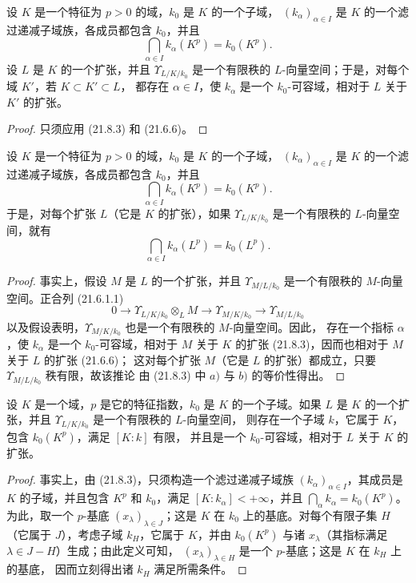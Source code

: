 
\begin{corollary}[21.8.4]
\label{0.21.8.4-fr}
设 $K$ 是一个特征为 $p>0$ 的域，$k_0$ 是 $K$ 的一个子域，
$(k_\alpha)_{\alpha\in I}$ 是 $K$ 的一个滤过递减子域族，各成员都包含
$k_0$，并且
\[
  \bigcap_{\alpha\in I}k_\alpha(K^p)=k_0(K^p).
\]
设 $L$ 是 $K$ 的一个扩张，并且 $\Upsilon_{L/K/k_0}$ 是一个有限秩的
$L$-向量空间；于是，对每个域 $K'$，若 $K\subset K'\subset L$，
都存在 $\alpha\in I$，使 $k_\alpha$ 是一个 $k_0$-可容域，相对于 $L$
关于 $K'$ 的扩张。
\end{corollary}

\begin{proof}
只须应用 (21.8.3) 和 (21.6.6)。
\end{proof}

\begin{corollary}[21.8.5]
\label{0.21.8.5-fr}
设 $K$ 是一个特征为 $p>0$ 的域，$k_0$ 是 $K$ 的一个子域，
$(k_\alpha)_{\alpha\in I}$ 是 $K$ 的一个滤过递减子域族，各成员都包含
$k_0$，并且
\[
  \bigcap_{\alpha\in I}k_\alpha(K^p)=k_0(K^p).
\]
于是，对每个扩张 $L$（它是 $K$ 的扩张），如果 $\Upsilon_{L/K/k_0}$ 是一个有限秩的
$L$-向量空间，就有
\[
  \bigcap_{\alpha\in I}k_\alpha(L^p)=k_0(L^p).
\]
\end{corollary}

\begin{proof}
事实上，假设 $M$ 是 $L$ 的一个扩张，并且 $\Upsilon_{M/L/k_0}$ 是一个有限秩的
$M$-向量空间。正合列 (21.6.1.1)
\[
  0\longrightarrow \Upsilon_{L/K/k_0}\otimes_L M
  \longrightarrow \Upsilon_{M/K/k_0}
  \longrightarrow \Upsilon_{M/L/k_0}
\]
以及假设表明，$\Upsilon_{M/K/k_0}$ 也是一个有限秩的 $M$-向量空间。因此，
存在一个指标 $\alpha$，使 $k_\alpha$ 是一个 $k_0$-可容域，相对于 $M$
关于 $K$ 的扩张 (21.8.3)，因而也相对于 $M$ 关于 $L$ 的扩张 (21.6.6)；
这对每个扩张 $M$（它是 $L$ 的扩张）都成立，只要 $\Upsilon_{M/L/k_0}$ 秩有限，故该推论
由 (21.8.3) 中 $a)$ 与 $b)$ 的等价性得出。
\end{proof}

\begin{corollary}[21.8.6]
\label{0.21.8.6-fr}
设 $K$ 是一个域，$p$ 是它的特征指数，$k_0$ 是 $K$ 的一个子域。如果 $L$
是 $K$ 的一个扩张，并且 $\Upsilon_{L/K/k_0}$ 是一个有限秩的 $L$-向量空间，
则存在一个子域 $k$，它属于 $K$，包含 $k_0(K^p)$，满足 $[K:k]$ 有限，
并且是一个 $k_0$-可容域，相对于 $L$ 关于 $K$ 的扩张。
\end{corollary}

\begin{proof}
事实上，由 (21.8.3)，只须构造一个滤过递减子域族
$(k_\alpha)_{\alpha\in I}$，其成员是 $K$ 的子域，并且包含 $K^p$ 和 $k_0$，满足
$[K:k_\alpha]<+\infty$，并且
$\bigcap_\alpha k_\alpha=k_0(K^p)$。为此，取一个 $p$-基底
$(x_\lambda)_{\lambda\in J}$；这是 $K$ 在 $k_0$ 上的基底。对每个有限子集
$H$（它属于 $J$），考虑子域 $k_H$，它属于 $K$，并由 $k_0(K^p)$ 与诸
$x_\lambda$（其指标满足 $\lambda\in J-H$）生成；由此定义可知，
$(x_\lambda)_{\lambda\in H}$ 是一个 $p$-基底；这是 $K$ 在 $k_H$ 上的基底，
因而立刻得出诸 $k_H$ 满足所需条件。
\end{proof}

